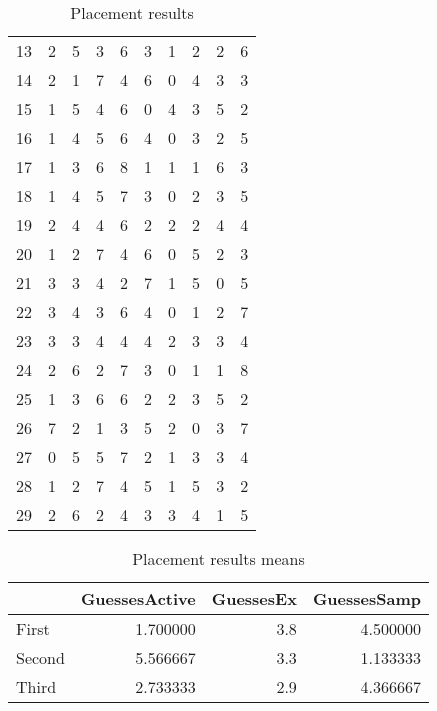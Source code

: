 \begin{table}
\begin{tabular}{lrrrrrrrrr}
13 &             2 &  5 &  3 &         6 &  3 &  1 &           2 &  2 &  6 \\
14 &             2 &  1 &  7 &         4 &  6 &  0 &           4 &  3 &  3 \\
15 &             1 &  5 &  4 &         6 &  0 &  4 &           3 &  5 &  2 \\
16 &             1 &  4 &  5 &         6 &  4 &  0 &           3 &  2 &  5 \\
17 &             1 &  3 &  6 &         8 &  1 &  1 &           1 &  6 &  3 \\
18 &             1 &  4 &  5 &         7 &  3 &  0 &           2 &  3 &  5 \\
19 &             2 &  4 &  4 &         6 &  2 &  2 &           2 &  4 &  4 \\
20 &             1 &  2 &  7 &         4 &  6 &  0 &           5 &  2 &  3 \\
21 &             3 &  3 &  4 &         2 &  7 &  1 &           5 &  0 &  5 \\
22 &             3 &  4 &  3 &         6 &  4 &  0 &           1 &  2 &  7 \\
23 &             3 &  3 &  4 &         4 &  4 &  2 &           3 &  3 &  4 \\
24 &             2 &  6 &  2 &         7 &  3 &  0 &           1 &  1 &  8 \\
25 &             1 &  3 &  6 &         6 &  2 &  2 &           3 &  5 &  2 \\
26 &             7 &  2 &  1 &         3 &  5 &  2 &           0 &  3 &  7 \\
27 &             0 &  5 &  5 &         7 &  2 &  1 &           3 &  3 &  4 \\
28 &             1 &  2 &  7 &         4 &  5 &  1 &           5 &  3 &  2 \\
29 &             2 &  6 &  2 &         4 &  3 &  3 &           4 &  1 &  5 \\
\bottomrule
\end{tabular}
\caption{Placement results}
\end{table}


\begin{table}
\begin{tabular}{lrrr}
\toprule
{} &  GuessesActive &  GuessesEx &  GuessesSamp \\
\midrule
First &       1.700000 &        3.8 &     4.500000 \\
Second &       5.566667 &        3.3 &     1.133333 \\
Third &       2.733333 &        2.9 &     4.366667 \\
\bottomrule
\end{tabular}
\caption{Placement results means}
\end{table}

